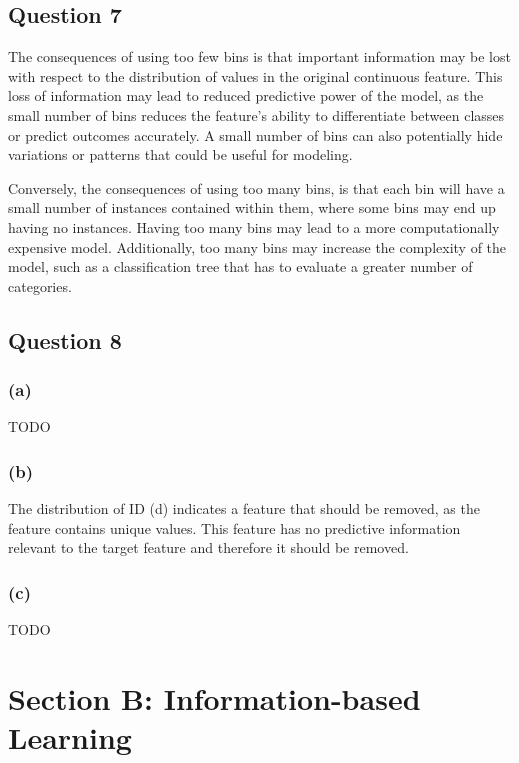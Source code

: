 \documentclass[10pt]{article}
\begin{document}
\subsection*{Question 7}

The consequences of using too few bins is that important information may be lost with respect to the
distribution of values in the original continuous feature. This loss of information may lead to reduced
predictive power of the model, as the small number of bins
reduces the feature's ability to differentiate between classes or predict outcomes accurately. A small number of
bins can also potentially hide variations or patterns that could be useful for modeling.

Conversely, the consequences of using too many bins, is that each bin will have a small number of instances
contained within them, where some bins may end up having no instances. Having too many bins may lead to
a more computationally expensive model. Additionally, too many bins may increase the complexity of the model,
such as a classification tree that has to evaluate a greater number of categories.

\subsection*{Question 8}

\subsubsection*{(a)}

TODO

\subsubsection*{(b)}

The distribution of ID (d) indicates a feature that should be removed, as the feature contains unique values.
This feature has no predictive information relevant to the target feature and therefore it should be removed.

\subsubsection*{(c)}

TODO

\section*{Section B: Information-based Learning}
\end{document}
